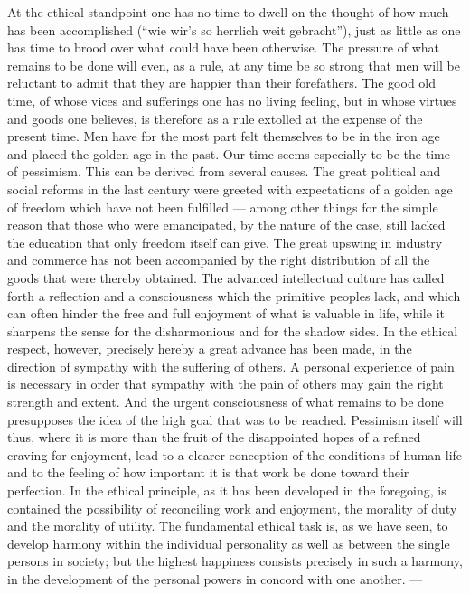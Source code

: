 \documentclass[12pt,a4paper,openany]{book}
\newcommand{\opage}[1]{\marginnote{\footnotesize\textit{[#1]}}}
\begin{document}
At the ethical standpoint one has no time to dwell on the thought of how
much has been accomplished (``wie wir's so herrlich weit gebracht''), just
as little as one has time to brood over what could have been otherwise.
The pressure of what remains to be done will even, as a rule, at any time
be so strong that men will be reluctant to admit that they are happier
than their forefathers. The good old time, of whose vices and sufferings
one has no living feeling, but in whose virtues and goods one believes, is
therefore as a rule extolled at the expense of the present time. Men have
for the most part felt themselves to be in the iron age and placed the
golden age in the past. Our time seems especially to be the time of
pessimism. This can be derived from several causes. The great political
and social reforms in the last century were greeted with expectations of a
golden age of freedom which have not been fulfilled --- among other things
for the simple reason that those who were emancipated, by the nature of the
case, still lacked the education that only freedom itself can give. The
great upswing in industry and commerce has not been accompanied by the
right distribution of all the goods that were thereby obtained. The
advanced \opage{106}intellectual culture has called forth a reflection and
a consciousness which the primitive peoples lack, and which can often
hinder the free and full enjoyment of what is valuable in life, while it
sharpens the sense for the disharmonious and for the shadow sides. In the
ethical respect, however, precisely hereby a great advance has been made,
in the direction of sympathy with the suffering of others. A personal
experience of pain is necessary in order that sympathy with the pain of
others may gain the right strength and extent. And the urgent
consciousness of what remains to be done presupposes the idea of the high
goal that was to be reached. Pessimism itself will thus, where it is more
than the fruit of the disappointed hopes of a refined craving for
enjoyment, lead to a clearer conception of the conditions of human life and
to the feeling of how important it is that work be done toward their
perfection. In the ethical principle, as it has been developed in the
foregoing, is contained the possibility of reconciling work and enjoyment,
the morality of duty and the morality of utility. The fundamental ethical
task is, as we have seen, to develop harmony within the individual
personality as well as between the single persons in society; but the
highest happiness consists precisely in such a harmony, in the development
of the personal powers in concord with one another. ---
\end{document}

